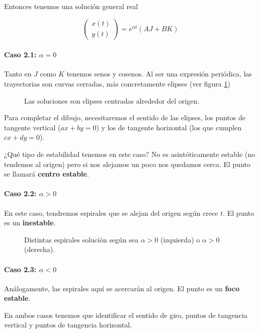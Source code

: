 Entonces tenemos una solución general real

\[ \begin{pmatrix}
x(t) \\ y(t)
\end{pmatrix} = e^{αt} \left(A J + B K \right) \]


\paragraph{Caso 2.1: $α=0$} Tanto en $J$ como $K$ tenemos senos y cosenos. Al ser una expresión periódica, las trayectorias son curvas cerradas, más concretamente elipses (ver figura \ref{imgSA-Elipses})

\begin{figure}[hbtp]
\caption{Las soluciones son elipses centradas alrededor del origen.}
\label{imgSA-Elipses}
\end{figure}

Para completar el dibujo, necesitaremos el sentido de las elipses, los puntos de tangente vertical ($ax+by=0$) y los de tangente horizontal (los que cumplen $cx+dy = 0$).

¿Qué tipo de estabilidad tenemos en este caso? No es asintóticamente estable (no tendemos al origen) pero si nos alejamos un poco nos quedamos cerca. El punto se llamará \textbf{centro estable}.

\paragraph{Caso 2.2: $α>0$} En este caso, tendremos espirales que se alejan del origen según crece $t$. El punto es un \textbf{ inestable}.

\begin{figure}[hbtp]
\caption{Distintas espirales solución según sea $α>0$ (izquierda) o $α>0$ (derecha).}
\label{imgSAEspirales}
\end{figure}

\paragraph{Caso 2.3: $α<0$} Análogamente, las espirales aquí se acercarán al origen. El punto es un \textbf{foco estable}.

En ambos casos tenemos que identificar el sentido de giro, puntos de tangencia vertical y puntos de tangencia horizontal.

